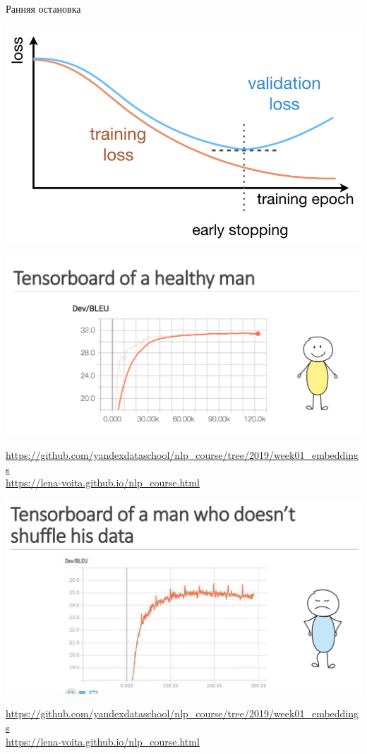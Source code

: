 \documentclass[notes,12pt, aspectratio=169]{beamer}
\begin{document}
\begin{frame}{Ранняя остановка}
\begin{center}
	\includegraphics[width=.95\linewidth]{early_stopping.png}
\end{center}
\end{frame}


\begin{frame}{ }
\begin{center}
	\includegraphics[width=.95\linewidth]{shuffle_1.png}
\end{center}
\vfill %
\footnotesize 
\color{blue} \url{https://github.com/yandexdataschool/nlp_course/tree/2019/week01_embeddings} \\ 
\url{https://lena-voita.github.io/nlp_course.html}
\end{frame}


\begin{frame}{ }
\begin{center}
	\includegraphics[width=.92\linewidth]{shuffle_2.png}
\end{center}
\vfill %
\footnotesize 
\color{blue} \url{https://github.com/yandexdataschool/nlp_course/tree/2019/week01_embeddings} \\
\url{https://lena-voita.github.io/nlp_course.html}
\end{frame}
\end{document}
